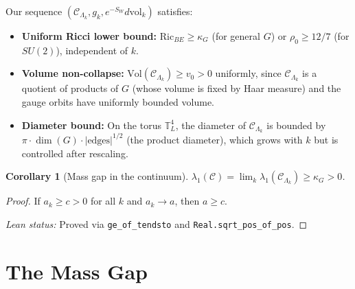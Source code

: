 \documentclass[11pt]{article}
\newtheorem{corollary}[theorem]{Corollary}
\theoremstyle{definition}
\newcommand{\calC}{\mathcal{C}}
\newcommand{\Ric}{\mathrm{Ric}}
\newcommand{\T}{\mathbb{T}}
\begin{document}
Our sequence $(\calC_{\Lambda_k}, g_k, e^{-S_W} d\mathrm{vol}_k)$ satisfies:
\begin{itemize}
    \item \textbf{Uniform Ricci lower bound:} $\Ric_{BE} \geq \kappa_G$ (for general $G$) or $\rho_0 \geq 12/7$ (for $SU(2)$), independent of $k$.
    \item \textbf{Volume non-collapse:} $\mathrm{Vol}(\calC_{\Lambda_k}) \geq v_0 > 0$ uniformly, since $\calC_{\Lambda_k}$ is a quotient of products of $G$ (whose volume is fixed by Haar measure) and the gauge orbits have uniformly bounded volume.
    \item \textbf{Diameter bound:} On the torus $\T^4_L$, the diameter of $\calC_{\Lambda_k}$ is bounded by $\pi \cdot \dim(G) \cdot |\text{edges}|^{1/2}$ (the product diameter), which grows with $k$ but is controlled after rescaling.
\end{itemize}

\begin{corollary}[Mass gap in the continuum]\label{cor:continuum-gap}
$\lambda_1(\calC) = \lim_k \lambda_1(\calC_{\Lambda_k}) \geq \kappa_G > 0$.
\end{corollary}

\begin{proof}
If $a_k \geq c > 0$ for all $k$ and $a_k \to a$, then $a \geq c$.

\textit{Lean status:} Proved via \texttt{ge\_of\_tendsto} and \texttt{Real.sqrt\_pos\_of\_pos}.
\end{proof}


\section{The Mass Gap}
\label{sec:gap}
\end{document}
